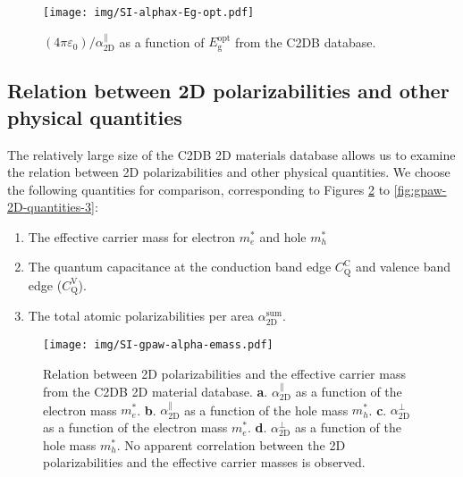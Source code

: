 \documentclass[manuscript=suppinfo,email=true,hyperref=true,keywords=false]{achemso}
\begin{document}
\begin{figure}[htbp]
  \centering
  \texttt{[image: img/SI-alphax-Eg-opt.pdf]}
  \caption{$(4\pi\varepsilon_{0})/\alpha_{\mathrm{2D}}^{\parallel}$ as a function of
    $E_{\mathrm{g}}^{\mathrm{opt}}$ from the C2DB database.}
  \label{fig:opt}
\end{figure}

\subsection{Relation between 2D polarizabilities and other physical quantities}
\label{sec:gpaw-3}

The relatively large size of the C2DB 2D materials database allows us
to examine the relation between 2D polarizabilities and other physical
quantities. We choose the following quantities for comparison,
corresponding to Figures \ref{fig:gpaw-2D-quantities-1} to
\ref{fig:gpaw-2D-quantities-3}:
\begin{enumerate}
\item The effective carrier mass for electron $m_{e}^{*}$ and hole $m_{h}^{*}$
  
\item The quantum capacitance at the conduction band edge
  $C_{\mathrm{Q}}^{\mathrm{C}}$ and valence band edge
  ($C_{\mathrm{Q}}^{\mathrm{V}}$).

  
\item The total atomic polarizabilities per area $\alpha_{\mathrm{2D}}^{\mathrm{sum}}$.
\end{enumerate}
\begin{figure}[htbp]
  \centering
  \texttt{[image: img/SI-gpaw-alpha-emass.pdf]}
  \caption{Relation between 2D polarizabilities and the effective
    carrier mass from the C2DB 2D material
    database. \textbf{a}. $\alpha_{\mathrm{2D}}^{\parallel}$ as a function of the
    electron mass $m_{e}^{*}$.  \textbf{b}. $\alpha_{\mathrm{2D}}^{\parallel}$ as a
    function of the hole mass
    $m_{h}^{*}$. \textbf{c}. $\alpha_{\mathrm{2D}}^{\perp}$ as a function of the
    electron mass $m_{e}^{*}$.  \textbf{d}. $\alpha_{\mathrm{2D}}^{\perp}$ as a
    function of the hole mass $m_{h}^{*}$. No apparent correlation
    between the 2D polarizabilities and the effective carrier masses
    is observed.}
  \label{fig:gpaw-2D-quantities-1}
\end{figure}
\end{document}

